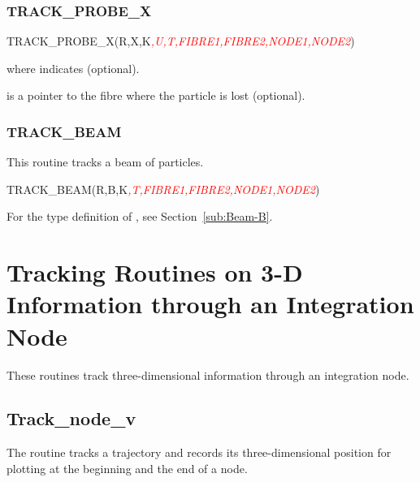 \subsubsection{TRACK\_PROBE\_X}

%
\begin{ptccode}
TRACK_PROBE_X(R,X,K\textit{\textcolor{red}{,U,T,FIBRE1,FIBRE2,NODE1,NODE2}})
\end{ptccode}

 where  indicates  (optional).

 is a pointer to the fibre where the particle is lost (optional).


\subsubsection{TRACK\_BEAM}

%
This routine tracks a beam of particles.

\begin{ptccode}
TRACK_BEAM(R,B,K\textit{\textcolor{red}{,T,FIBRE1,FIBRE2,NODE1,NODE2}})
\end{ptccode}

For the type definition of , see Section~\ref{sub:Beam-B}.


\section{Tracking Routines on 3-D Information through an Integration Node}

%
These routines track three-dimensional information through an integration node.


\subsection{Track\_node\_v}

%
The  routine tracks a trajectory and records its
three-dimensional position for plotting at the beginning and the end of a node.

